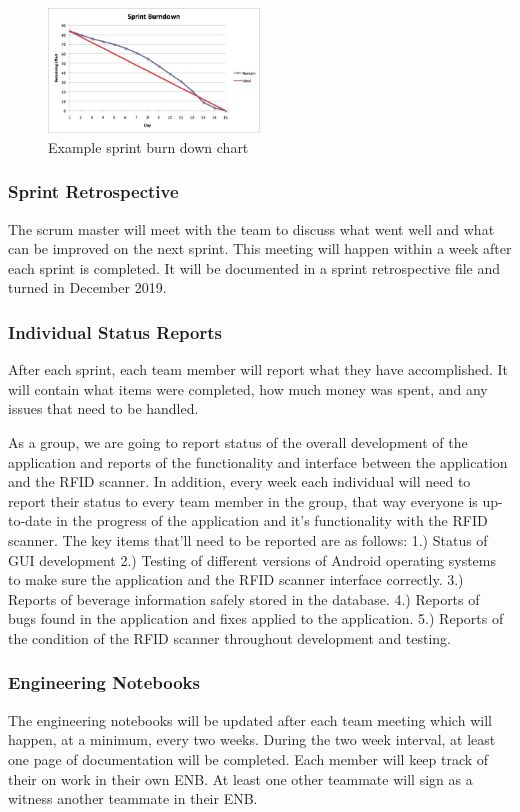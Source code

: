 \begin{figure}[h!]
    \centering
    \includegraphics[width=0.5\textwidth]{images/Sprint_Burndown}
    \caption{Example sprint burn down chart}
\end{figure}

\subsubsection{Sprint Retrospective}
The scrum master will meet with the team to discuss what went well and what can be improved on the next sprint. This meeting will happen within a week after each sprint is completed. It will be documented in a sprint retrospective file and turned in December 2019.

\subsubsection{Individual Status Reports}
After each sprint, each team member will report what they have accomplished. It will contain what items were completed, how much money was spent, and any issues that need to be handled.

As a group, we are going to report status of the overall development of the application and reports of the functionality and interface between the application and the RFID scanner.  In addition, every week each individual will need to report their status to every team member in the group, that way everyone is up-to-date in the progress of the application and it's functionality with the RFID scanner.  The key items that'll need to be reported are as follows:
1.) Status of GUI development
2.) Testing of different versions of Android operating systems to make sure the application and the RFID scanner interface correctly.
3.) Reports of beverage information safely stored in the database.
4.) Reports of bugs found in the application and fixes applied to the application.
5.) Reports of the condition of the RFID scanner throughout development and testing.

\subsubsection{Engineering Notebooks}
The engineering notebooks will be updated after each team meeting which will happen, at a minimum, every two weeks. During the two week interval, at least one page of documentation will be completed. Each member will keep track of their on work in their own ENB. At least one other teammate will sign as a witness another teammate in their ENB.



